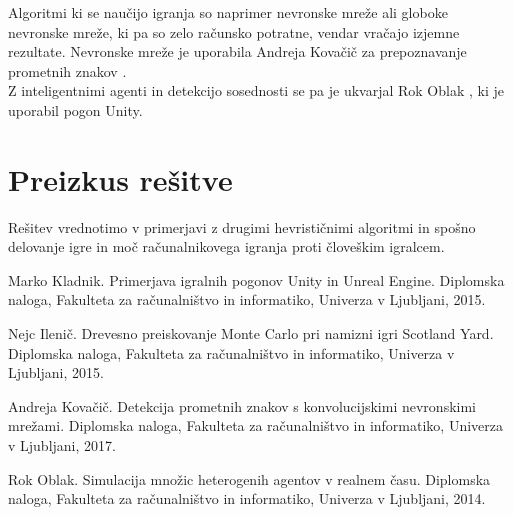 \documentclass[11pt,a4paper]{article}
\begin{document}
Algoritmi ki se naučijo igranja so naprimer nevronske mreže ali globoke nevronske mreže, ki pa so zelo računsko potratne, vendar vračajo izjemne rezultate. Nevronske mreže je uporabila Andreja Kovačič za prepoznavanje prometnih znakov \cite{diplomaNevronskeMreze}.\\
Z inteligentnimi agenti in detekcijo sosednosti se pa je ukvarjal Rok Oblak \cite{diplomaAgenti}, ki je uporabil pogon Unity.
\section{Preizkus rešitve}
Rešitev vrednotimo v primerjavi z drugimi hevrističnimi algoritmi in spošno delovanje igre in moč računalnikovega igranja proti človeškim igralcem.

\begin{thebibliography}{9}
	
Marko Kladnik.
Primerjava igralnih pogonov Unity in Unreal Engine.
Diplomska naloga, Fakulteta za računalništvo in informatiko, Univerza v Ljubljani, 2015.

Nejc Ilenič.
Drevesno preiskovanje Monte Carlo pri namizni igri Scotland Yard. 
Diplomska naloga, Fakulteta za računalništvo in informatiko, Univerza v Ljubljani, 2015.

Andreja Kovačič.
Detekcija prometnih znakov s konvolucijskimi nevronskimi mrežami.
Diplomska naloga, Fakulteta za računalništvo in informatiko, Univerza v Ljubljani, 2017.

Rok Oblak.
Simulacija množic heterogenih agentov v realnem času.
Diplomska naloga, Fakulteta za računalništvo in informatiko, Univerza v Ljubljani, 2014.
\end{thebibliography}
\end{document}
